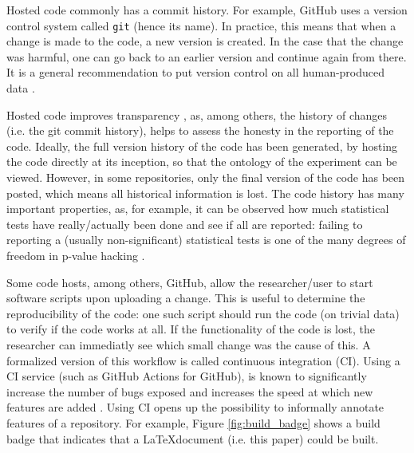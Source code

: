 
Hosted code commonly has a commit history. For example, GitHub
uses a version control system called \verb|git| (hence its name).
In practice, this means that when a change is made to the code,
a new version is created. In the case that the change was harmful,
one can go back to an earlier version and continue again from there.
It is a general recommendation to put version control
on all human-produced data \cite{wilson2014best}.


Hosted code improves transparency \cite{gorgolewski2016practical},
as, among others, the history of changes (i.e. the git commit history), 
helps to assess the honesty in the reporting of the code. 
Ideally, the full version history of the code 
has been generated, by hosting the code directly at its inception,
so that the ontology of the experiment can be viewed.
However, in some repositories, only the final version of the code has been
posted, which means all historical information is lost.
The code history has many important properties,
as, for example, 
it can be observed how much statistical tests have really/actually been done 
and see if all are reported:
failing to reporting a (usually non-significant) statistical tests is 
one of the many degrees of freedom 
in p-value hacking \cite{wicherts2016degrees}.


Some code hosts, among others, GitHub, 
allow the researcher/user to start software scripts upon uploading a change.
This is useful to determine the reproducibility of the code: 
one such script should run the code (on trivial data) 
to verify if the code works at all.
If the functionality of the code is lost, the researcher
can immediatly see which small change was the cause of this.
A formalized version of this workflow is called continuous integration (CI).
Using a CI service (such as GitHub Actions for GitHub), 
is known to significantly 
increase the number of bugs exposed \cite{vasilescu2015} and increases
the speed at which new features are added \cite{vasilescu2015}.
Using CI opens up the possibility to informally annotate features of
a repository. For example, Figure \ref{fig:build_badge} shows a 
build badge that indicates that a \LaTeX document (i.e. this paper)
could be built.

